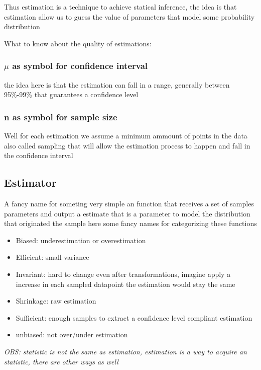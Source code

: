 Thus estimation is a technique to achieve statical inference, the idea is that estimation allow us to guess the value of parameters that model some probability distribution

What to know about the quality of estimations:

\subsubsection{$\mu$ as symbol for confidence interval}

the idea here is that the estimation can fall in a range, generally between 95\%-99\% that guarantees a confidence level

\subsubsection{n as symbol for sample size}

Well for each estimation we assume a minimum ammount of points in the data also called sampling that will allow the estimation process to happen and fall in the confidence interval

\cite{notesEstimation}

\subsection{Estimator}

A fancy name for someting very simple an function that receives a set of samples parameters and output a estimate that is a parameter to model the distribution that originated the sample
here some fancy names for categorizing these functions \cite{yt1}

\begin{itemize}
	\item Biased: underestimation or overestimation
	\item Efficient: small variance
	\item Invariant: hard to change even after transformations, imagine apply a increase in each sampled datapoint the estimation would stay the same
	\item Shrinkage: raw estimation
	\item Sufficient: enough samples to extract a confidence level compliant estimation
	\item  unbiased: not over/under estimation
\end{itemize}
\textit{OBS: statistic is not the same as estimation, estimation is a way to acquire an statistic, there are other ways as well}
\cite{howto}

